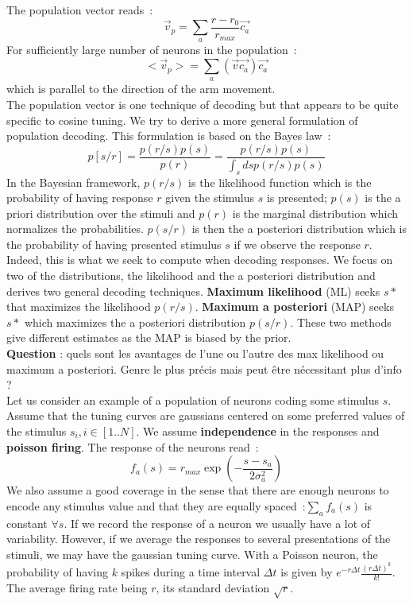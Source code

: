 \documentclass[10pt,a4paper]{article}
\begin{document}
The population vector reads~:
\begin{equation}
\vec{v}_p = \sum_a \frac{r - r_0}{r_{max}} \vec{c_a}
\end{equation}
For sufficiently large number of neurons in the population~:
\begin{equation}
<\vec{v}_p> = \sum_a (\vec{v} \vec{c_a}) \vec{c_a}
\end{equation}
which is parallel to the direction of the arm movement.\\

The population vector is one technique of decoding but that appears to
be quite specific to cosine tuning. We try to derive a more general
formulation of population decoding. This formulation is based on the
Bayes law~:
\begin{equation}
p[s / r] = \frac{p(r/s)p(s)}{p(r)} = \frac{p(r/s)p(s)}{\int_s ds p(r/s)p(s)}
\end{equation}
In the Bayesian framework, $p(r/s)$ is the likelihood function which
is the probability of having response $r$ given the stimulus $s$ is
presented; $p(s)$ is the a priori distribution over the stimuli and
$p(r)$ is the marginal distribution which normalizes the
probabilities. $p(s/r)$ is then the a posteriori distribution which is
the probability of having presented stimulus $s$ if we observe the
response $r$. Indeed, this is what we seek to compute when decoding
responses. We focus on two of the distributions, the likelihood and
the a posteriori distribution and derives two general decoding
techniques. \textbf{Maximum likelihood} (ML) seeks $s*$ that maximizes the
likelihood $p(r/s)$. \textbf{Maximum a posteriori} (MAP) seeks $s*$ which
maximizes the a posteriori distribution $p(s/r)$. These two methods
give different estimates as the MAP is biased by the prior.\\


\textbf{Question} : quels sont les avantages de l'une ou l'autre des
max likelihood ou maximum a posteriori. Genre le plus précis mais peut
être nécessitant plus d'info ?\\

Let us consider an example of a population of neurons coding some
stimulus $s$. Assume that the tuning curves are gaussians centered on
some preferred values of the stimulus $s_i, i \in [1..N]$. We assume
\textbf{independence} in the responses and \textbf{poisson
  firing}. The response of the neurons read~:
\begin{equation}
f_a(s) = r_{max} \exp(-\frac{s - s_a}{2 \sigma_a^2})
\end{equation}
We also assume a good coverage in the sense that there are enough
neurons to encode any stimulus value and that they are equally
spaced~:$\sum_a f_a(s)$ is constant $\forall s$. If we record the
response of a neuron we usually have a lot of variability. However, if
we average the responses to several presentations of the stimuli, we
may have the gaussian tuning curve. With a Poisson neuron, the
probability of having $k$ spikes during a time interval $\Delta t$ is
given by $e^{-r\Delta t} \frac{(r \Delta t)^k}{k!}$. The average
firing rate being $r$, its standard deviation $\sqrt{r}$.\\
\end{document}
